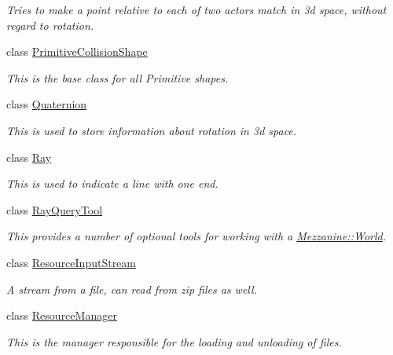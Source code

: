 \begin{DoxyCompactItemize}
\begin{DoxyCompactList}\small\item\em Tries to make a point relative to each of two actors match in 3d space, without regard to rotation. \item\end{DoxyCompactList}\item 
class \hyperlink{classMezzanine_1_1PrimitiveCollisionShape}{PrimitiveCollisionShape}
\begin{DoxyCompactList}\small\item\em This is the base class for all Primitive shapes. \item\end{DoxyCompactList}\item 
class \hyperlink{classMezzanine_1_1Quaternion}{Quaternion}
\begin{DoxyCompactList}\small\item\em This is used to store information about rotation in 3d space. \item\end{DoxyCompactList}\item 
class \hyperlink{classMezzanine_1_1Ray}{Ray}
\begin{DoxyCompactList}\small\item\em This is used to indicate a line with one end. \item\end{DoxyCompactList}\item 
class \hyperlink{classMezzanine_1_1RayQueryTool}{RayQueryTool}
\begin{DoxyCompactList}\small\item\em This provides a number of optional tools for working with a \hyperlink{classMezzanine_1_1World}{Mezzanine::World}. \item\end{DoxyCompactList}\item 
class \hyperlink{classMezzanine_1_1ResourceInputStream}{ResourceInputStream}
\begin{DoxyCompactList}\small\item\em A stream from a file, can read from zip files as well. \item\end{DoxyCompactList}\item 
class \hyperlink{classMezzanine_1_1ResourceManager}{ResourceManager}
\begin{DoxyCompactList}\small\item\em This is the manager responsible for the loading and unloading of files. \item\end{DoxyCompactList}\item 

\end{DoxyCompactItemize}
